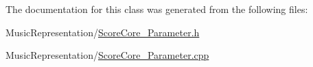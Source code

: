 The documentation for this class was generated from the following files\-:\begin{DoxyCompactItemize}
\item 
Music\-Representation/\hyperlink{_score_core___parameter_8h}{Score\-Core\-\_\-\-Parameter.\-h}\item 
Music\-Representation/\hyperlink{_score_core___parameter_8cpp}{Score\-Core\-\_\-\-Parameter.\-cpp}\end{DoxyCompactItemize}

